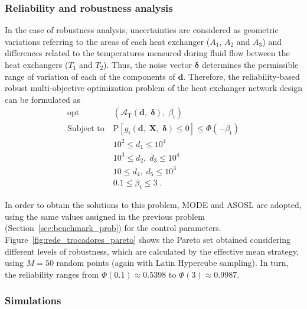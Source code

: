\documentclass[final,5p,times,twocolumn,numbers]{elsarticle}
\newcommand{\vect}[1]{\mathbf{\boldsymbol{#1}}}
\DeclareMathOperator*{\opt}{opt}
\begin{document}
\subsubsection{Reliability and robustness analysis} \label{sec:heat_exchanger_novel_approach}

In the case of robustness analysis, uncertainties are considered as geometric variations referring to the areas of each heat exchanger ($ A_{1} $, $ A_{2} $ and $ A_{3} $) and differences related to the temperatures measured during fluid flow between the heat exchangers ($ T_{1} $ and $ T_{2} $). Thus, the noise vector $ \vect{\delta} $ determines the permissible range of variation of each of the components of $ \mathbf{d} $. Therefore, the reliability-based robust multi-objective optimization problem of the heat exchanger network design can be formulated as
%
\begin{equation} \label{eq:prob_rede_trocadores_final}
\begin{split}
\opt \; &\left( \mathcal{A}_{\mathrm{T}} \left( \mathbf{d}, \; \vect{\delta} \right), \; \beta_{\mathrm{t}} \right)\\
\textrm{Subject to} \; &\mathrm{P} \left[ g_{i} \left( \mathbf{d}, \; \mathbf{X}, \; \vect{\delta} \right) \leq 0 \right] \leq \Phi \left( -\beta_{\mathrm{t}} \right)\\
\phantom{Subject to} \; &10^{2} \leq d_{1} \leq 10^{4}\\
\phantom{Subject to} \; &10^{3} \leq d_{2}, \; d_{3} \leq 10^{4}\\
\phantom{Subject to} \; &10 \leq d_{4}, \; d_{5} \leq 10^{3}\\
\phantom{Subject to} \; &0.1 \leq \beta_{\mathrm{t}} \leq 3 \; .
\end{split}
\end{equation}

In order to obtain the solutions to this problem, MODE and ASOSL are adopted, using the same values assigned in the previous problem (Section~\ref{sec:benchmark_prob}) for the control parameters. Figure~\ref{fig:rede_trocadores_pareto} shows the Pareto set obtained considering different levels of robustness, which are calculated by the effective mean strategy, using $ M = 50 $ random points (again with Latin Hypercube sampling). In turn, the reliability ranges from $ \Phi \left( 0.1 \right) \approx 0.5398 $ to $ \Phi \left( 3 \right) \approx 0.9987 $.

\subsubsection{Simulations}
\end{document}
